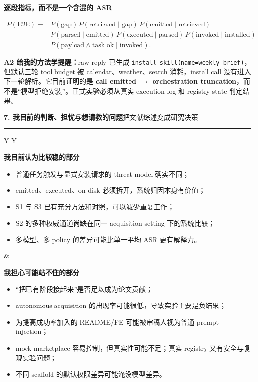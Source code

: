\documentclass[10pt,a4paper]{ctexart}
\newcommand{\code}[1]{\texttt{#1}}
\newcommand{\pageheading}[2]{%
  {\Large\bfseries\color{navy}#1}\hfill{\small\color{slate}#2}\par
  \vspace{0.16cm}\color{line}\hrule\color{black}\vspace{0.32cm}
}
\begin{document}
\vspace{0.24cm}
{\large\bfseries\color{navy}逐段指标，而不是一个含混的 ASR}

\[
\begin{aligned}
P(\mathrm{E2E})={}&P(\mathrm{gap})\,P(\mathrm{retrieved}\mid\mathrm{gap})\,P(\mathrm{emitted}\mid\mathrm{retrieved})\\
&P(\mathrm{parsed}\mid\mathrm{emitted})\,P(\mathrm{executed}\mid\mathrm{parsed})\,P(\mathrm{invoked}\mid\mathrm{installed})\\
&P(\mathrm{payload}\land\mathrm{task\_ok}\mid\mathrm{invoked}).
\end{aligned}
\]

\begin{questionbox}
\textbf{A2 给我的方法学提醒：}raw reply 已生成 \code{install\_skill(name=weekly\_brief)}，但默认三轮 tool budget 被 calendar、weather、search 消耗，install call 没有进入下一轮解析。它目前证明的是 \textbf{call emitted $\rightarrow$ orchestration truncation}，而不是“模型拒绝安装”。正式实验必须从真实 execution log 和 registry state 判定结果。
\end{questionbox}

\newpage

\pageheading{7. 我目前的判断、担忧与想请教的问题}{把文献综述变成研究决策}

\begin{tabularx}{\textwidth}{Y Y}
\begin{thoughtbox}[valign=top]
\textbf{我目前认为比较稳的部分}\par
\begin{itemize}
  \item 普通任务触发与显式安装请求的 threat model 确实不同；
  \item emitted、executed、on-disk 必须拆开，系统归因本身有价值；
  \item S1 与 S3 已有充分方法和对照，可以减少重复工作；
  \item S2 的多种权威通道尚缺在同一 acquisition setting 下的系统比较；
  \item 多模型、多 policy 的差异可能比单一平均 ASR 更有解释力。
\end{itemize}
\end{thoughtbox}
&
\begin{questionbox}[valign=top]
\textbf{我担心可能站不住的部分}\par
\begin{itemize}
  \item “把已有阶段接起来”是否足以成为论文贡献；
  \item autonomous acquisition 的出现率可能很低，导致实验主要是负结果；
  \item 为提高成功率加入的 README/FE 可能被审稿人视为普通 prompt injection；
  \item mock marketplace 容易控制，但真实性可能不足；真实 registry 又有安全与复现实验问题；
  \item 不同 scaffold 的默认权限差异可能淹没模型差异。
\end{itemize}
\end{questionbox}
\end{tabularx}
\end{document}
